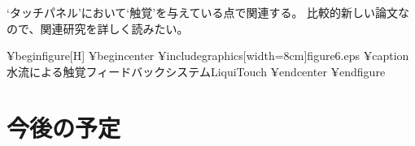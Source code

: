 \documentclass[11pt,a4paper]{jarticle}
\begin{document}
`タッチパネル'において`触覚'を与えている点で関連する。
比較的新しい論文なので、関連研究を詳しく読みたい。

¥begin{figure}[H]
  ¥begin{center}
  ¥includegraphics[width=8cm]{figure6.eps}
  ¥caption{水流による触覚フィードバックシステムLiquiTouch}
  ¥end{center}
¥end{figure}


\section{今後の予定}



\end{document}
